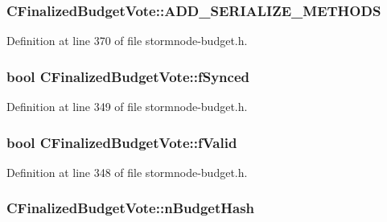 \subsubsection[{A\+D\+D\+\_\+\+S\+E\+R\+I\+A\+L\+I\+Z\+E\+\_\+\+M\+E\+T\+H\+O\+D\+S}]{\setlength{\rightskip}{0pt plus 5cm}C\+Finalized\+Budget\+Vote\+::\+A\+D\+D\+\_\+\+S\+E\+R\+I\+A\+L\+I\+Z\+E\+\_\+\+M\+E\+T\+H\+O\+D\+S}\label{class_c_finalized_budget_vote_a3f53b91508d16154326dc743775cf5e9}


Definition at line 370 of file stormnode-\/budget.\+h.

\hypertarget{class_c_finalized_budget_vote_acf10705c636a83d7b1a45404a0195902}{}
\subsubsection[{f\+Synced}]{\setlength{\rightskip}{0pt plus 5cm}bool C\+Finalized\+Budget\+Vote\+::f\+Synced}\label{class_c_finalized_budget_vote_acf10705c636a83d7b1a45404a0195902}


Definition at line 349 of file stormnode-\/budget.\+h.

\hypertarget{class_c_finalized_budget_vote_aef317580b2f8a41d739e825acbdbb04a}{}
\subsubsection[{f\+Valid}]{\setlength{\rightskip}{0pt plus 5cm}bool C\+Finalized\+Budget\+Vote\+::f\+Valid}\label{class_c_finalized_budget_vote_aef317580b2f8a41d739e825acbdbb04a}


Definition at line 348 of file stormnode-\/budget.\+h.

\hypertarget{class_c_finalized_budget_vote_a2aec1fb12151d1c028e755e20f452272}{}
\subsubsection[{n\+Budget\+Hash}]{ C\+Finalized\+Budget\+Vote\+::n\+Budget\+Hash}\label{class_c_finalized_budget_vote_a2aec1fb12151d1c028e755e20f452272}



